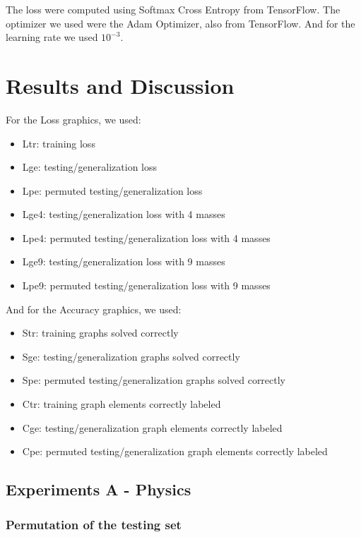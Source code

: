 The loss were computed using Softmax Cross Entropy from TensorFlow. The optimizer we used were the Adam Optimizer, also from TensorFlow. And for the learning rate we used $10^{-3}$.

\section{Results and Discussion}

For the Loss graphics, we used:

    \begin{itemize}
        \item Ltr: training loss
        \item Lge: testing/generalization loss
        \item Lpe: permuted testing/generalization loss
        \item Lge4: testing/generalization loss with 4 masses
        \item Lpe4: permuted testing/generalization loss with 4 masses
        \item Lge9: testing/generalization loss with 9 masses
        \item Lpe9: permuted testing/generalization loss with 9 masses
    \end{itemize}
    
And for the Accuracy graphics, we used:

    \begin{itemize}
        \item Str: training graphs solved correctly
        \item Sge: testing/generalization graphs solved correctly
        \item Spe: permuted testing/generalization graphs solved correctly
        \item Ctr: training graph elements correctly labeled
        \item Cge: testing/generalization graph elements correctly labeled
        \item Cpe: permuted testing/generalization graph elements correctly labeled
    \end{itemize}

\subsection{Experiments A - Physics}

\subsubsection {Permutation of the testing set}

